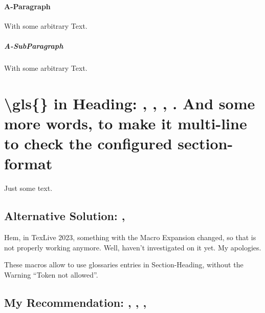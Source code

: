 \paragraph{A-Paragraph}
With some arbitrary Text.

\subparagraph{A-SubParagraph}
With some arbitrary Text.





\section{\textbackslash gls\{\} in Heading:
    \texorpdfstring{}{DLL},
    \texorpdfstring{}{DLL},
    \texorpdfstring{}{DLLs},
    \texorpdfstring{}{DLLs}.
And some more words, to make it multi-line to check the configured section-format}

Just some text.



\edef\tokenA{\glsentrytext{dll}}
\edef\tokenB{\glsentrydesc{dll}}
\subsection{Alternative Solution: \texorpdfstring{\tokenA}{DLL}, \texorpdfstring{\tokenB}{DLL}}
Hem, in TexLive 2023, something with the Macro Expansion changed, so that is not properly working anymore. Well, haven't investigated on it yet. My apologies.

These macros allow to use glossaries entries in Section-Heading, without the Warning \enquote{Token not allowed}.


\subsection{My Recommendation: 
, ,
, 
}

